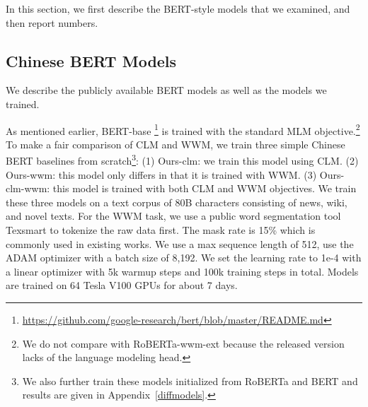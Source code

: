 \documentclass[11pt]{article}
\newcommand{\ourrobertafurther}{\textsl{RoBERTa-clm-wwm}\ }
\begin{document}
In this section, we first 
describe the BERT-style models that we examined, and then report numbers.



\subsection{Chinese BERT Models}
We describe the publicly available BERT models as well as the models we trained. 

As mentioned earlier, BERT-base \cite{devlin2018bert}\footnote{\url{https://github.com/google-research/bert/blob/master/README.md}} is trained with the standard MLM objective.\footnote{We do not compare with RoBERTa-wwm-ext because the released version lacks of the language modeling head.} To make a fair comparison of CLM and WWM, we train three simple Chinese BERT baselines from scratch\footnote{We also further train these models initialized from RoBERTa and BERT and results are given in Appendix~\ref{diffmodels}.}:
(1) Ours-clm: we train this model using CLM. (2) Ours-wwm: this model only differs in that it is trained with WWM. (3) Ours-clm-wwm: this model is trained with both CLM and WWM objectives. %
We train these three models on a text corpus of 80B characters consisting of news, wiki, and novel texts.
For the WWM task, we use a public word segmentation tool Texsmart \cite{texsmart2020} to tokenize the raw data first.
The mask rate is 15\% which is commonly used in existing works.
We use a max sequence length of 512, use the ADAM optimizer \cite{kingma2014adam} with a batch size of 8,192. 
We set the learning rate to 1e-4 with a linear optimizer with 5k warmup steps and 100k training steps in total.
Models are trained on 64 Tesla V100 GPUs for about 7 days.
\end{document}
